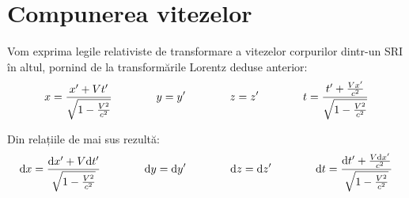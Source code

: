 \section{Compunerea vitezelor}

Vom exprima legile relativiste de transformare a vitezelor corpurilor dintr-un
SRI în altul, pornind de la transformările Lorentz deduse anterior:
\begin{equation*}
    \begin{aligned}[t]
        x = \frac{x' + Vt'}{\sqrt{1 - \frac{V^2}{c^2}}}
    \end{aligned}\qquad\qquad
    \begin{aligned}[t]
        y = y'
    \end{aligned}\qquad\qquad
    \begin{aligned}[t]
        z = z'
    \end{aligned}\qquad\qquad
    \begin{aligned}[t]
        t = \frac{t' + \frac{Vx'}{c^2}}{\sqrt{1 - \frac{V^2}{c^2}}}
    \end{aligned}
\end{equation*}

Din relațiile de mai sus rezultă:
\begin{equation*}
    \begin{aligned}[t]
        \mathrm{d} x = \frac{\mathrm{d} x' + V\mathrm{d} t'}{\sqrt{1 - \frac{V^2}{c^2}}}
    \end{aligned}\qquad\qquad
    \begin{aligned}[t]
        \mathrm{d} y = \mathrm{d} y'
    \end{aligned}\qquad\qquad
    \begin{aligned}[t]
        \mathrm{d} z = \mathrm{d} z'
    \end{aligned}\qquad\qquad
    \begin{aligned}[t]
        \mathrm{d} t = \frac{\mathrm{d} t' + \frac{V\mathrm{d} x'}{c^2}}{\sqrt{1 - \frac{V^2}{c^2}}}
    \end{aligned}
\end{equation*}

